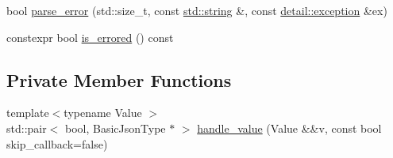 \begin{DoxyCompactItemize}
\item 
bool \mbox{\hyperlink{classnlohmann_1_1detail_1_1json__sax__dom__callback__parser_aac6e64f0b59c9150cde974e182d5ecab}{parse\+\_\+error}} (std\+::size\+\_\+t, const \mbox{\hyperlink{namespacenlohmann_1_1detail_a1ed8fc6239da25abcaf681d30ace4985ab45cffe084dd3d20d928bee85e7b0f21}{std\+::string}} \&, const \mbox{\hyperlink{classnlohmann_1_1detail_1_1exception}{detail\+::exception}} \&ex)
\item 
constexpr bool \mbox{\hyperlink{classnlohmann_1_1detail_1_1json__sax__dom__callback__parser_a167fd9bf385d3d08bcbbba8a927c0eff}{is\+\_\+errored}} () const
\end{DoxyCompactItemize}
\subsection*{Private Member Functions}
\begin{DoxyCompactItemize}
\item 
{\footnotesize template$<$typename Value $>$ }\\std\+::pair$<$ bool, Basic\+Json\+Type $\ast$ $>$ \mbox{\hyperlink{classnlohmann_1_1detail_1_1json__sax__dom__callback__parser_a875e678e20e75b37b93b80be78fe60e6}{handle\+\_\+value}} (Value \&\&v, const bool skip\+\_\+callback=false)
\end{DoxyCompactItemize}

